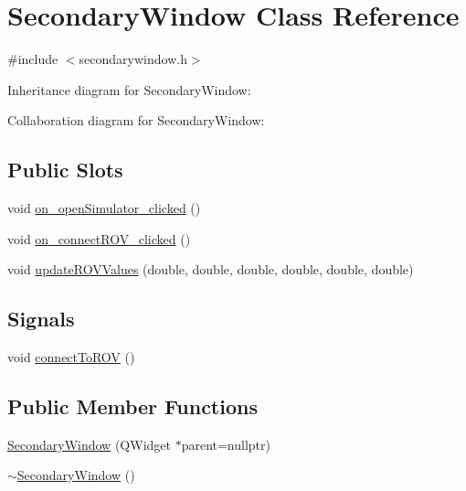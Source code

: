 \hypertarget{class_secondary_window}{}\section{Secondary\+Window Class Reference}
\label{class_secondary_window}


{\ttfamily \#include $<$secondarywindow.\+h$>$}



Inheritance diagram for Secondary\+Window\+:


Collaboration diagram for Secondary\+Window\+:
\subsection*{Public Slots}
\begin{DoxyCompactItemize}
\item 
void \mbox{\hyperlink{class_secondary_window_a0f90b91908ca874a5babaaf365326b86}{on\+\_\+open\+Simulator\+\_\+clicked}} ()
\item 
void \mbox{\hyperlink{class_secondary_window_ac273d33aab31b4a12b7c7688c504f349}{on\+\_\+connect\+R\+O\+V\+\_\+clicked}} ()
\item 
void \mbox{\hyperlink{class_secondary_window_a603b5f6354b9a4db56d8ff3c5f0f5cf2}{update\+R\+O\+V\+Values}} (double, double, double, double, double, double)
\end{DoxyCompactItemize}
\subsection*{Signals}
\begin{DoxyCompactItemize}
\item 
void \mbox{\hyperlink{class_secondary_window_a1f50424805e3e3545d726e48666ecb14}{connect\+To\+R\+OV}} ()
\end{DoxyCompactItemize}
\subsection*{Public Member Functions}
\begin{DoxyCompactItemize}
\item 
\mbox{\hyperlink{class_secondary_window_ada7e8bd04f97a10187d96c0f7954d19c}{Secondary\+Window}} (Q\+Widget $\ast$parent=nullptr)
\item 
\mbox{\hyperlink{class_secondary_window_a631a54788ff219afd9be3c6378113277}{$\sim$\+Secondary\+Window}} ()
\end{DoxyCompactItemize}
